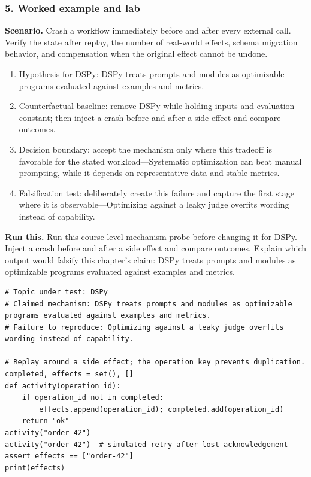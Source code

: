 \subsubsection*{5. Worked example and lab}
\textbf{Scenario.} Crash a workflow immediately before and after every external call. Verify the state after replay, the number of real-world effects, schema migration behavior, and compensation when the original effect cannot be undone.
\begin{enumerate}
\item Hypothesis for DSPy: DSPy treats prompts and modules as optimizable programs evaluated against examples and metrics.
\item Counterfactual baseline: remove DSPy while holding inputs and evaluation constant; then inject a crash before and after a side effect and compare outcomes.
\item Decision boundary: accept the mechanism only where this tradeoff is favorable for the stated workload—Systematic optimization can beat manual prompting, while it depends on representative data and stable metrics.
\item Falsification test: deliberately create this failure and capture the first stage where it is observable—Optimizing against a leaky judge overfits wording instead of capability.
\end{enumerate}
\textbf{Run this.} Run this course-level mechanism probe before changing it for DSPy. Inject a crash before and after a side effect and compare outcomes. Explain which output would falsify this chapter's claim: DSPy treats prompts and modules as optimizable programs evaluated against examples and metrics.
\begin{Verbatim}[fontsize=\scriptsize]
# Topic under test: DSPy
# Claimed mechanism: DSPy treats prompts and modules as optimizable programs evaluated against examples and metrics.
# Failure to reproduce: Optimizing against a leaky judge overfits wording instead of capability.

# Replay around a side effect; the operation key prevents duplication.
completed, effects = set(), []
def activity(operation_id):
    if operation_id not in completed:
        effects.append(operation_id); completed.add(operation_id)
    return "ok"
activity("order-42")
activity("order-42")  # simulated retry after lost acknowledgement
assert effects == ["order-42"]
print(effects)
\end{Verbatim}
